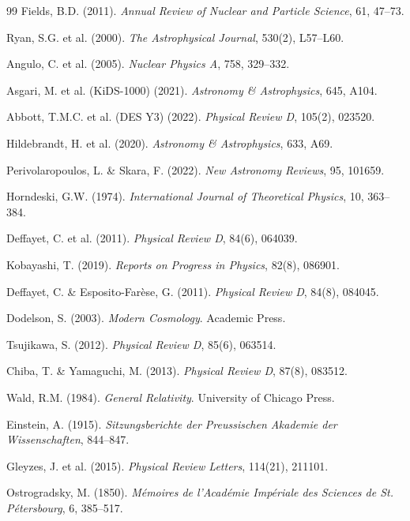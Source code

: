 \documentclass[12pt,a4paper]{book}
\theoremstyle{definition}
\theoremstyle{remark}
\begin{document}
\begin{thebibliography}{99}
 Fields, B.D. (2011). \textit{Annual Review of Nuclear and Particle Science}, 61, 47--73.

 Ryan, S.G. et al. (2000). \textit{The Astrophysical Journal}, 530(2), L57--L60.

 Angulo, C. et al. (2005). \textit{Nuclear Physics A}, 758, 329--332.

 Asgari, M. et al. (KiDS-1000) (2021). \textit{Astronomy \& Astrophysics}, 645, A104.

 Abbott, T.M.C. et al. (DES Y3) (2022). \textit{Physical Review D}, 105(2), 023520.

 Hildebrandt, H. et al. (2020). \textit{Astronomy \& Astrophysics}, 633, A69.

 Perivolaropoulos, L. \& Skara, F. (2022). \textit{New Astronomy Reviews}, 95, 101659.

 Horndeski, G.W. (1974). \textit{International Journal of Theoretical Physics}, 10, 363--384.

 Deffayet, C. et al. (2011). \textit{Physical Review D}, 84(6), 064039.

 Kobayashi, T. (2019). \textit{Reports on Progress in Physics}, 82(8), 086901.

 Deffayet, C. \& Esposito-Far\`ese, G. (2011). \textit{Physical Review D}, 84(8), 084045.

 Dodelson, S. (2003). \textit{Modern Cosmology}. Academic Press.

 Tsujikawa, S. (2012). \textit{Physical Review D}, 85(6), 063514.

 Chiba, T. \& Yamaguchi, M. (2013). \textit{Physical Review D}, 87(8), 083512.

 Wald, R.M. (1984). \textit{General Relativity}. University of Chicago Press.

 Einstein, A. (1915). \textit{Sitzungsberichte der Preussischen Akademie der Wissenschaften}, 844--847.

 Gleyzes, J. et al. (2015). \textit{Physical Review Letters}, 114(21), 211101.

 Ostrogradsky, M. (1850). \textit{M\'emoires de l'Acad\'emie Imp\'eriale des Sciences de St. P\'etersbourg}, 6, 385--517.


\end{thebibliography}
\end{document}
